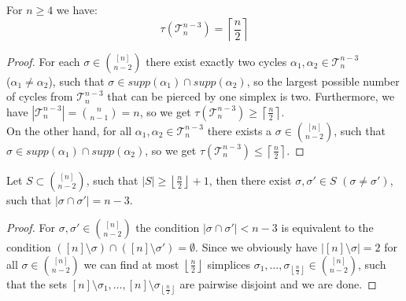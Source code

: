 
\begin{lem}\label{lemma12}
For \(n\geq 4\) we have:
\[
\tau(\mathcal{T}_n^{n-3})=\left\lceil\frac{n}{2}\right\rceil
\]
\begin{proof}
For each \(\sigma\in\binom{[n]}{n-2}\) there exist exactly two cycles \(\alpha_1,\alpha_2\in\mathcal{T}_n^{n-3}\)\\
(\(\alpha_1\neq\alpha_2\)), such that \(\sigma\in supp(\alpha_1)\cap supp(\alpha_2)\), so the largest possible number of cycles from \(\mathcal{T}_n^{n-3}\) that can be pierced by one simplex is two. Furthermore, we have \(\left|\mathcal{T}_n^{n-3}\right|=\binom{n}{n-1}=n\), so we get \(\tau(\mathcal{T}_n^{n-3})\geq\left\lceil\frac{n}{2}\right\rceil\).\\
On the other hand, for all \(\alpha_1,\alpha_2\in\mathcal{T}_n^{n-3}\) there exists a \(\sigma\in\binom{[n]}{n-2}\), such that \(\sigma\in supp(\alpha_1)\cap supp(\alpha_2)\), so we get \(\tau(\mathcal{T}_n^{n-3})\leq\left\lceil\frac{n}{2}\right\rceil\).
\end{proof}
\end{lem}

\begin{lem}\label{lemma13}
Let \(S\subset\binom{[n]}{n-2}\), such that \(\left|S\right|\geq\left\lfloor\frac{n}{2}\right\rfloor+1\), then there exist \(\sigma,\sigma'\in S\) \((\sigma\neq\sigma')\), such that \(\left|\sigma\cap\sigma'\right|=n-3\).
\begin{proof}
For \(\sigma,\sigma'\in\binom{[n]}{n-2}\) the condition \(\left|\sigma\cap\sigma'\right|<n-3\) is equivalent to the condition \(([n]\setminus\sigma)\cap([n]\setminus\sigma')=\emptyset\). Since we obviously have \(\left|[n]\setminus\sigma\right|=2\) for all \(\sigma\in\binom{[n]}{n-2}\) we can find at most \(\left\lfloor\frac{n}{2}\right\rfloor\) simplices \(\sigma_1,\ldots,\sigma_{\left\lfloor\frac{n}{2}\right\rfloor}\in\binom{[n]}{n-2}\), such that the sets \([n]\setminus\sigma_1,\ldots,[n]\setminus\sigma_{\left\lfloor\frac{n}{2}\right\rfloor}\) are pairwise disjoint and we are done.
\end{proof}
\end{lem}

